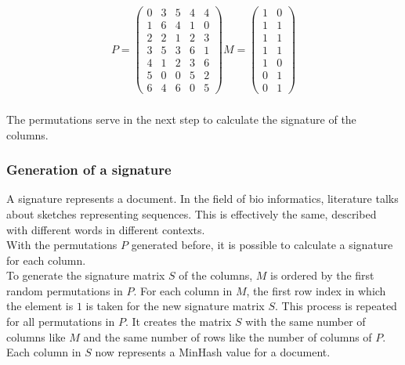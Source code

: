 \begin{equation}
    \begin{split}
        P = 
        \begin{pmatrix}
            0 & 3 & 5 & 4 & 4 \\
            1 & 6 & 4 & 1 & 0 \\
            2 & 2 & 1 & 2 & 3 \\
            3 & 5 & 3 & 6 & 1 \\
            4 & 1 & 2 & 3 & 6 \\
            5 & 0 & 0 & 5 & 2 \\
            6 & 4 & 6 & 0 & 5
        \end{pmatrix}
        M = 
        \begin{pmatrix}
            1 & 0 \\
            1 & 1 \\
            1 & 1 \\
            1 & 1 \\
            1 & 0 \\
            0 & 1 \\
            0 & 1
        \end{pmatrix}   
    \end{split}
\end{equation} \\

The permutations serve in the next step to calculate the signature of the columns.\\

\subsubsection{Generation of a signature}

A signature represents a document. In the field of bio informatics, literature talks about sketches representing sequences. This is effectively the same, described with different words in different contexts.\\

With the permutations $ P $ generated before, it is possible to calculate a signature for each column.\\

To generate the signature matrix $ S $ of the columns, $ M $ is ordered by the first random permutations in $ P $. For each column in $ M $, the first row index in which the element is $ 1 $ is taken for the new signature matrix $ S $. This process is repeated for all permutations in $ P $.  It creates the matrix $ S $ with the same number of columns like $ M $ and the same number of rows like the number of columns of $ P $. Each column in $ S $ now represents a MinHash value for a document.\\

